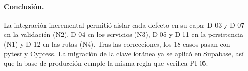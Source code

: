 \paragraph{Conclusión.} La integración incremental permitió aislar cada defecto en su capa: D-03 y D-07 en la validación (N2), D-04 en los servicios (N3), D-05 y D-11 en la persistencia (N1) y D-12 en las rutas (N4). Tras las correcciones, los 18 casos pasan con pytest y Cypress. La migración de la clave foránea ya se aplicó en Supabase, así que la base de producción cumple la misma regla que verifica PI-05.
